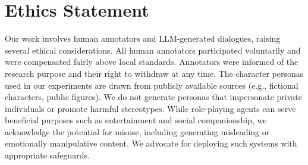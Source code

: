 \documentclass[11pt]{article}
\begin{document}
\section{Ethics Statement}
Our work involves human annotators and LLM-generated dialogues, raising several ethical considerations. All human annotators participated voluntarily and were compensated fairly above local standards. Annotators were informed of the research purpose and their right to withdraw at any time. The character personas used in our experiments are drawn from publicly available sources (e.g., fictional characters, public figures). We do not generate personas that impersonate private individuals or promote harmful stereotypes. While role-playing agents can serve beneficial purposes such as entertainment and social companionship, we acknowledge the potential for misuse, including generating misleading or emotionally manipulative content. We advocate for deploying such systems with appropriate safeguards.


%





\appendix

\end{document}
